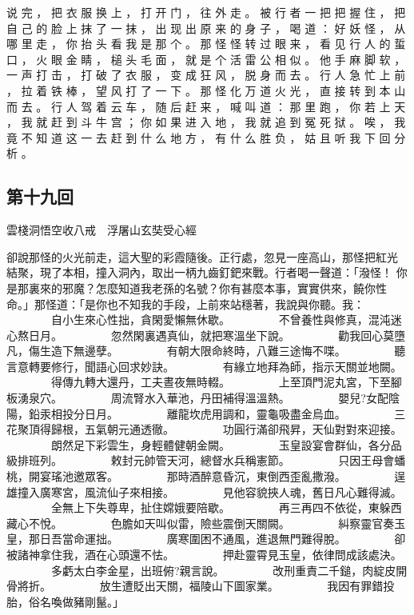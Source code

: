 {说 完 ， 把 衣 服 换 上 ， 打 开 门 ， 往 外 走 。
被 行 者 一 把 把 握 住 ， 把 自 己 的 脸 上 抹 了 一 抹 ， 出 现 出 原 来 的 身 子 ， 喝 道 ： 好 妖 怪 ， 从 哪 里 走 ， 你 抬 头 看 我 是 那 个 。 那 怪 怪 转 过 眼 来 ， 看 见 行 人 的 蜇 口 ， 火 眼 金 睛 ， 槌 头 毛 面 ， 就 是 个 活 雷 公 相 似 。
他 手 麻 脚 软 ， 一 声 打 击 ， 打 破 了 衣 服 ， 变 成 狂 风 ， 脱 身 而 去 。
行 人 急 忙 上 前 ， 拉 着 铁 棒 ， 望 风 打 了 一 下 。
那 怪 化 万 道 火 光 ， 直 接 转 到 本 山 而 去 。
行 人 驾 着 云 车 ， 随 后 赶 来 ， 喊 叫 道 ： 那 里 跑 ， 你 若 上 天 ， 我 就 赶 到 斗 牛 宫 ； 你 如 果 进 入 地 ， 我 就 追 到 冤 死 狱 。
唉 ， 我 竟 不 知 道 这 一 去 赶 到 什 么 地 方 ， 有 什 么 胜 负 ， 姑 且 听 我 下 回 分 析 。
}\switchcolumn\flushpage  \begin{pinyinscope}{\myfontt \section{第十九回}     雲棧洞悟空收八戒　浮屠山玄奘受心經

卻說那怪的火光前走，這大聖的彩霞隨後。正行處，忽見一座高山，那怪把紅光
結聚，現了本相，撞入洞內，取出一柄九齒釘鈀來戰。行者喝一聲道：「潑怪！
你是那裏來的邪魔？怎麼知道我老孫的名號？你有甚麼本事，實實供來，饒你性
命。」那怪道：「是你也不知我的手段，上前來站穩著，我說與你聽。我：
　　　　自小生來心性拙，貪閑愛懶無休歇。
　　　　不曾養性與修真，混沌迷心熬日月。
　　　　忽然閑裏遇真仙，就把寒溫坐下說。
　　　　勸我回心莫墮凡，傷生造下無邊孽。
　　　　有朝大限命終時，八難三途悔不喋。
　　　　聽言意轉要修行，聞語心回求妙訣。
　　　　有緣立地拜為師，指示天關並地闕。
　　　　得傳九轉大還丹，工夫晝夜無時輟。
　　　　上至頂門泥丸宮，下至腳板湧泉穴。
　　　　周流腎水入華池，丹田補得溫溫熱。
　　　　嬰兒?女配陰陽，鉛汞相投分日月。
　　　　離龍坎虎用調和，靈龜吸盡金烏血。
　　　　三花聚頂得歸根，五氣朝元通透徹。
　　　　功圓行滿卻飛昇，天仙對對來迎接。
　　　　朗然足下彩雲生，身輕體健朝金闕。
　　　　玉皇設宴會群仙，各分品級排班列。
　　　　敕封元帥管天河，總督水兵稱憲節。
　　　　只因王母會蟠桃，開宴瑤池邀眾客。
　　　　那時酒醉意昏沉，東倒西歪亂撒潑。
　　　　逞雄撞入廣寒宮，風流仙子來相接。
　　　　見他容貌挾人魂，舊日凡心難得滅。
　　　　全無上下失尊卑，扯住嫦娥要陪歇。
　　　　再三再四不依從，東躲西藏心不悅。
　　　　色膽如天叫似雷，險些震倒天關闕。
　　　　糾察靈官奏玉皇，那日吾當命運拙。
　　　　廣寒圍困不通風，進退無門難得脫。
　　　　卻被諸神拿住我，酒在心頭還不怯。
　　　　押赴靈霄見玉皇，依律問成該處決。
　　　　多虧太白李金星，出班俯?親言說。
　　　　改刑重責二千鎚，肉綻皮開骨將折。
　　　　放生遭貶出天關，福陵山下圖家業。
　　　　我因有罪錯投胎，俗名喚做豬剛鬣。」

}
\end{pinyinscope}
